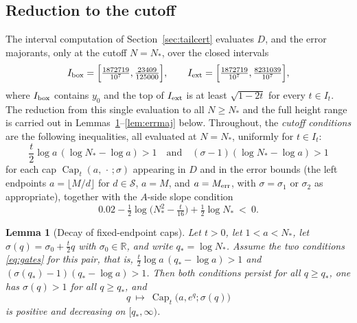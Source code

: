 \documentclass[11pt]{article}
\newtheorem{lemma}[theorem]{Lemma}
\theoremstyle{definition}
\newcommand{\R}{\mathbb{R}}
\newcommand{\calS}{\mathcal{S}}
\newcommand{\CapT}{\operatorname{Cap}}
\begin{document}
\subsection{Reduction to the cutoff}\label{sec:tailmono}

The interval computation of Section~\ref{sec:tailcert} evaluates
$D$, and the error majorants, only at the cutoff $N=N_*$, over the
closed intervals
\[
I_{\rm box}=\Bigl[\tfrac{1872719}{10^7},\tfrac{23409}{125000}\Bigr],
\qquad
I_{\rm ext}=\Bigl[\tfrac{1872719}{10^7},\tfrac{8231039}{10^7}\Bigr],
\]
where $I_{\rm box}$ contains $y_0$ and the top of $I_{\rm ext}$ is
at least $\sqrt{1-2t}$ for every $t\in I_t$. The reduction from
this single evaluation to all $N\ge N_*$ and the full height range
is carried out in Lemmas~\ref{lem:capdecay}--\ref{lem:errmaj}
below. Throughout, the \emph{cutoff conditions} are the following
inequalities, all evaluated at $N=N_*$, uniformly for $t\in I_t$:
\begin{equation}\label{eq:gates}
\frac t2\log a\,(\log N_*-\log a)>1
\quad\text{and}\quad
(\sigma-1)(\log N_*-\log a)>1
\end{equation}
for each cap $\CapT_t(a,\,\cdot\,;\sigma)$ appearing in $D$ and in
the error bounds (the left endpoints $a=\lfloor M/d\rfloor$ for
$d\in\calS$, $a=M$, and $a=M_{\rm err}$, with $\sigma=\sigma_1$ or
$\sigma_2$ as appropriate), together with the $A$-side slope
condition
\begin{equation}\label{eq:ym}
0.02-\tfrac12\log\bigl(N_*^2-\tfrac t{16}\bigr)+\tfrac12\log N_*\ <\ 0 .
\end{equation}

\begin{lemma}[Decay of fixed-endpoint caps]\label{lem:capdecay}
Let $t>0$, let $1<a<N_*$, let $\sigma(q)=\sigma_0+\frac t2q$ with
$\sigma_0\in\R$, and write $q_*=\log N_*$. Assume the two
conditions \eqref{eq:gates} for this pair, that is,
$\frac t2\log a\,(q_*-\log a)>1$ and
$(\sigma(q_*)-1)(q_*-\log a)>1$. Then both conditions persist for
all $q\ge q_*$, one has $\sigma(q)>1$ for all $q\ge q_*$, and
\[
q\ \longmapsto\ \CapT_t\bigl(a,e^q;\sigma(q)\bigr)
\]
is positive and decreasing on $[q_*,\infty)$.
\end{lemma}
\end{document}
